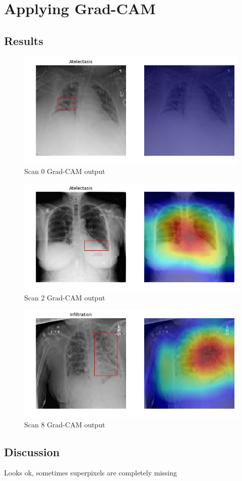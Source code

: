 \section{Applying Grad-CAM}

\subsection{Results}
\begin{figure}[H]
\centering
\caption{Scan 0 Grad-CAM output}
\includegraphics[width=12cm]{chapters/03_classification/images/grad-cam_0.png}
\end{figure}

\begin{figure}[H]
\centering
\caption{Scan 2 Grad-CAM output}
\includegraphics[width=12cm]{chapters/03_classification/images/grad-cam_2.png}
\end{figure}

\begin{figure}[H]
\centering
\caption{Scan 8 Grad-CAM output}
\includegraphics[width=12cm]{chapters/03_classification/images/grad-cam_8.png}
\end{figure}

\subsection{Discussion}
Looks ok, sometimes superpixels are completely missing

